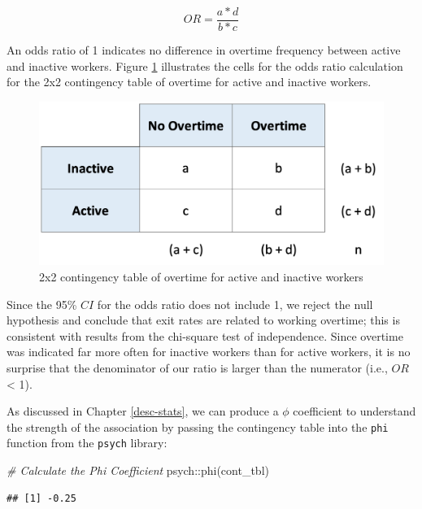 \documentclass[
]{book}
\newenvironment{Shaded}{\begin{snugshade}}{\end{snugshade}}
\newcommand{\CommentTok}[1]{\textcolor[rgb]{0.56,0.35,0.01}{\textit{#1}}}
\newcommand{\FunctionTok}[1]{\textcolor[rgb]{0.00,0.00,0.00}{#1}}
\newcommand{\NormalTok}[1]{#1}
\newcommand{\SpecialCharTok}[1]{\textcolor[rgb]{0.00,0.00,0.00}{#1}}
\begin{document}
\[OR = \frac{a*d}{b*c}\]

An odds ratio of 1 indicates no difference in overtime frequency between active and inactive workers. Figure \ref{fig:contingency-tbl} illustrates the cells for the odds ratio calculation for the 2x2 contingency table of overtime for active and inactive workers.

\begin{figure}

{\centering \includegraphics[width=0.75\linewidth]{graphics/contingency_table} 

}

\caption{2x2 contingency table of overtime for active and inactive workers}\label{fig:contingency-tbl}
\end{figure}

Since the 95\% \(CI\) for the odds ratio does not include 1, we reject the null hypothesis and conclude that exit rates are related to working overtime; this is consistent with results from the chi-square test of independence. Since overtime was indicated far more often for inactive workers than for active workers, it is no surprise that the denominator of our ratio is larger than the numerator (i.e., \(OR\) \textless{} 1).

As discussed in Chapter \ref{desc-stats}, we can produce a \(\phi\) coefficient to understand the strength of the association by passing the contingency table into the \texttt{phi} function from the \texttt{psych} library:

\begin{Shaded}
\begin{Highlighting}[]
\CommentTok{\# Calculate the Phi Coefficient}
\NormalTok{psych}\SpecialCharTok{::}\FunctionTok{phi}\NormalTok{(cont\_tbl)}
\end{Highlighting}
\end{Shaded}

\begin{verbatim}
## [1] -0.25
\end{verbatim}
\end{document}
